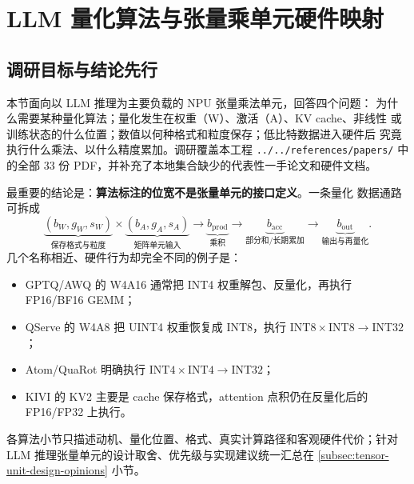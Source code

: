 
\providecommand{\qsrc}[2]{\href{#2}{\textnormal{[#1]}}}
\providecommand{\Wfmt}[2]{\mathrm{W#1A#2}}

\section{LLM 量化算法与张量乘单元硬件映射}
\label{sec:llm-quant-algorithm}

\subsection{调研目标与结论先行}

本节面向以 LLM 推理为主要负载的 NPU 张量乘法单元，回答四个问题：
为什么需要某种量化算法；量化发生在权重（W）、激活（A）、KV cache、非线性
或训练状态的什么位置；数值以何种格式和粒度保存；低比特数据进入硬件后
究竟执行什么乘法、以什么精度累加。调研覆盖本工程 \texttt{../../references/papers/} 中的全部
33 份 PDF，并补充了本地集合缺少的代表性一手论文和硬件文档。

最重要的结论是：\textbf{算法标注的位宽不是张量单元的接口定义}。一条量化
数据通路可拆成
\begin{equation}
  \underbrace{(b_W,g_W,s_W)}_{\text{保存格式与粒度}}
  \times
  \underbrace{(b_A,g_A,s_A)}_{\text{矩阵单元输入}}
  \longrightarrow
  \underbrace{b_{\mathrm{prod}}}_{\text{乘积}}
  \longrightarrow
  \underbrace{b_{\mathrm{acc}}}_{\text{部分和/长期累加}}
  \longrightarrow
  \underbrace{b_{\mathrm{out}}}_{\text{输出与再量化}}.
  \label{eq:quant-datapath-contract}
\end{equation}
几个名称相近、硬件行为却完全不同的例子是：
\begin{itemize}
  \item GPTQ/AWQ 的 W4A16 通常把 INT4 权重解包、反量化，再执行 FP16/BF16 GEMM；
  \item QServe 的 W4A8 把 UINT4 权重恢复成 INT8，执行
  $\mathrm{INT8}\times\mathrm{INT8}\rightarrow\mathrm{INT32}$；
  \item Atom/QuaRot 明确执行 $\mathrm{INT4}\times\mathrm{INT4}\rightarrow\mathrm{INT32}$；
  \item KIVI 的 KV2 主要是 cache 保存格式，attention 点积仍在反量化后的
  FP16/FP32 上执行。
\end{itemize}

各算法小节只描述动机、量化位置、格式、真实计算路径和客观硬件代价；针对 LLM
推理张量单元的设计取舍、优先级与实现建议统一汇总在
\ref{subsec:tensor-unit-design-opinions} 小节。

